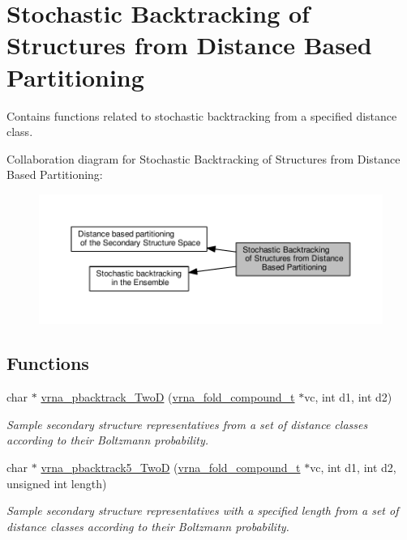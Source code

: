 \hypertarget{group__kl__neighborhood__stochbt}{}\section{Stochastic Backtracking of Structures from Distance Based Partitioning}
\label{group__kl__neighborhood__stochbt}


Contains functions related to stochastic backtracking from a specified distance class.  


Collaboration diagram for Stochastic Backtracking of Structures from Distance Based Partitioning\+:
\nopagebreak
\begin{figure}[H]
\begin{center}
\leavevmode
\includegraphics[width=350pt]{group__kl__neighborhood__stochbt}
\end{center}
\end{figure}
\subsection*{Functions}
\begin{DoxyCompactItemize}
\item 
char $\ast$ \hyperlink{group__kl__neighborhood__stochbt_ga14aceef73f83bbde77bb3a0ca06c9d13}{vrna\+\_\+pbacktrack\+\_\+\+TwoD} (\hyperlink{group__fold__compound_ga1b0cef17fd40466cef5968eaeeff6166}{vrna\+\_\+fold\+\_\+compound\+\_\+t} $\ast$vc, int d1, int d2)
\begin{DoxyCompactList}\small\item\em Sample secondary structure representatives from a set of distance classes according to their Boltzmann probability. \end{DoxyCompactList}\item 
char $\ast$ \hyperlink{group__kl__neighborhood__stochbt_ga6504913303bc325659c365d5f59b41e0}{vrna\+\_\+pbacktrack5\+\_\+\+TwoD} (\hyperlink{group__fold__compound_ga1b0cef17fd40466cef5968eaeeff6166}{vrna\+\_\+fold\+\_\+compound\+\_\+t} $\ast$vc, int d1, int d2, unsigned int length)
\begin{DoxyCompactList}\small\item\em Sample secondary structure representatives with a specified length from a set of distance classes according to their Boltzmann probability. \end{DoxyCompactList}\end{DoxyCompactItemize}


